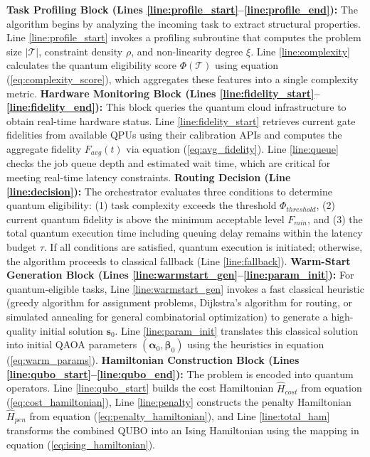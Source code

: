 \documentclass[lettersize,journal]{IEEEtran}
\begin{document}
\textbf{Task Profiling Block (Lines \ref{line:profile_start}--\ref{line:profile_end}):} The algorithm begins by analyzing the incoming task to extract structural properties. Line \ref{line:profile_start} invokes a profiling subroutine that computes the problem size $|\mathcal{T}|$, constraint density $\rho$, and non-linearity degree $\xi$. Line \ref{line:complexity} calculates the quantum eligibility score $\Phi(\mathcal{T})$ using equation (\ref{eq:complexity_score}), which aggregates these features into a single complexity metric.
\textbf{Hardware Monitoring Block (Lines \ref{line:fidelity_start}--\ref{line:fidelity_end}):} This block queries the quantum cloud infrastructure to obtain real-time hardware status. Line \ref{line:fidelity_start} retrieves current gate fidelities from available QPUs using their calibration APIs and computes the aggregate fidelity $F_{avg}(t)$ via equation (\ref{eq:avg_fidelity}). Line \ref{line:queue} checks the job queue depth and estimated wait time, which are critical for meeting real-time latency constraints.
\textbf{Routing Decision (Line \ref{line:decision}):} The orchestrator evaluates three conditions to determine quantum eligibility: (1) task complexity exceeds the threshold $\Phi_{threshold}$, (2) current quantum fidelity is above the minimum acceptable level $F_{min}$, and (3) the total quantum execution time including queuing delay remains within the latency budget $\tau$. If all conditions are satisfied, quantum execution is initiated; otherwise, the algorithm proceeds to classical fallback (Line \ref{line:fallback}).
\textbf{Warm-Start Generation Block (Lines \ref{line:warmstart_gen}--\ref{line:param_init}):} For quantum-eligible tasks, Line \ref{line:warmstart_gen} invokes a fast classical heuristic (greedy algorithm for assignment problems, Dijkstra's algorithm for routing, or simulated annealing for general combinatorial optimization) to generate a high-quality initial solution $\mathbf{s}_0$. Line \ref{line:param_init} translates this classical solution into initial QAOA parameters $(\boldsymbol{\alpha}_0, \boldsymbol{\beta}_0)$ using the heuristics in equation (\ref{eq:warm_params}).
\textbf{Hamiltonian Construction Block (Lines \ref{line:qubo_start}--\ref{line:qubo_end}):} The problem is encoded into quantum operators. Line \ref{line:qubo_start} builds the cost Hamiltonian $\hat{H}_{cost}$ from equation (\ref{eq:cost_hamiltonian}), Line \ref{line:penalty} constructs the penalty Hamiltonian $\hat{H}_{pen}$ from equation (\ref{eq:penalty_hamiltonian}), and Line \ref{line:total_ham} transforms the combined QUBO into an Ising Hamiltonian using the mapping in equation (\ref{eq:ising_hamiltonian}).
\end{document}
